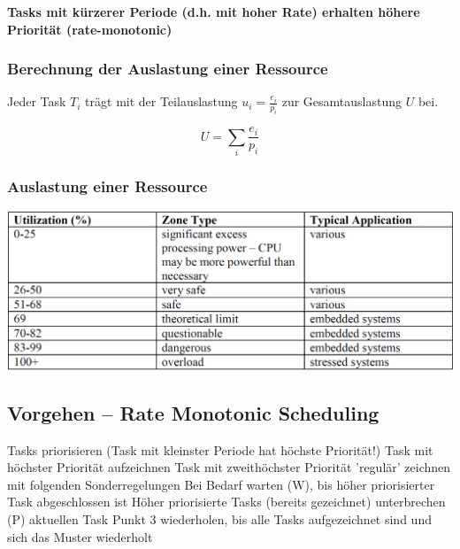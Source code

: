 \vspace{0.1cm}

\textbf{Tasks mit kürzerer Periode (d.h. mit hoher Rate) erhalten höhere Priorität (rate-monotonic)}


\subsubsection{Berechnung der Auslastung einer Ressource}

\begin{minipage}[t]{0.48\columnwidth}
    Jeder Task $T_i$ trägt mit der Teilauslastung $u_i = \frac{e_i}{p_i}$ zur Gesamtauslastung $U$ bei.
\end{minipage}
\hfill
\begin{minipage}[t]{0.48\columnwidth}
    \vspace{-0.2cm}
    $$ U = \sum\limits_{i} \frac{e_i}{p_i} $$
\end{minipage}

\subsubsection{Auslastung einer Ressource}

\begin{center}
    \includegraphics[width=0.9\columnwidth]{images/tabelle_auslastung_system.png}
\end{center}


\subsection{Vorgehen -- Rate Monotonic Scheduling}

\begingroup
\renewcommand{\outlinei}{enumerate}
\renewcommand{\outlineii}{itemize}
\begin{outline}
    \1 Tasks priorisieren (Task mit kleinster Periode hat höchste Priorität!)
    \1 Task mit höchster Priorität aufzeichnen
    \1 Task mit zweithöchster Priorität 'regulär' zeichnen mit folgenden Sonderregelungen
        \2 Bei Bedarf warten (W), bis höher priorisierter Task abgeschlossen ist 
        \2 Höher priorisierte Tasks (bereits gezeichnet) unterbrechen (P) aktuellen Task
    \1 Punkt 3 wiederholen, bis alle Tasks aufgezeichnet sind und sich das Muster wiederholt
\end{outline}
\endgroup


